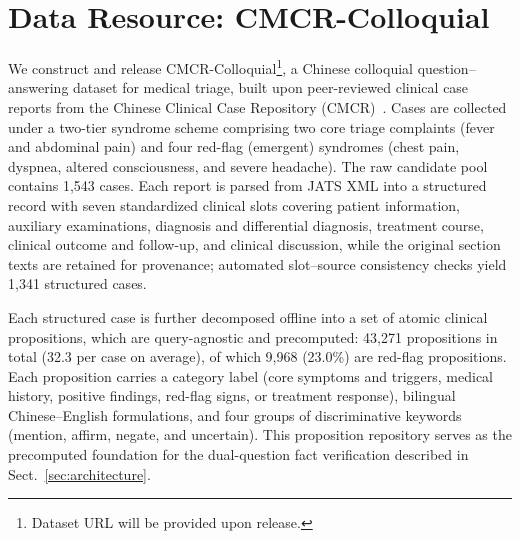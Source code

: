
\section{Data Resource: CMCR-Colloquial}
\label{sec:data}

We construct and release CMCR-Colloquial\footnote{Dataset URL will be provided upon release.}, a Chinese colloquial question--answering dataset for medical triage, built upon peer-reviewed clinical case reports from the Chinese Clinical Case Repository (CMCR)~\cite{cmcr}. Cases are collected under a two-tier syndrome scheme comprising two core triage complaints (fever and abdominal pain) and four red-flag (emergent) syndromes (chest pain, dyspnea, altered consciousness, and severe headache). The raw candidate pool contains 1{,}543 cases. Each report is parsed from JATS XML into a structured record with seven standardized clinical slots covering patient information, auxiliary examinations, diagnosis and differential diagnosis, treatment course, clinical outcome and follow-up, and clinical discussion, while the original section texts are retained for provenance; automated slot--source consistency checks yield 1{,}341 structured cases.

Each structured case is further decomposed offline into a set of atomic clinical propositions, which are query-agnostic and precomputed: 43{,}271 propositions in total (32.3 per case on average), of which 9{,}968 (23.0\%) are red-flag propositions. Each proposition carries a category label (core symptoms and triggers, medical history, positive findings, red-flag signs, or treatment response), bilingual Chinese--English formulations, and four groups of discriminative keywords (mention, affirm, negate, and uncertain). This proposition repository serves as the precomputed foundation for the dual-question fact verification described in Sect.~\ref{sec:architecture}.


